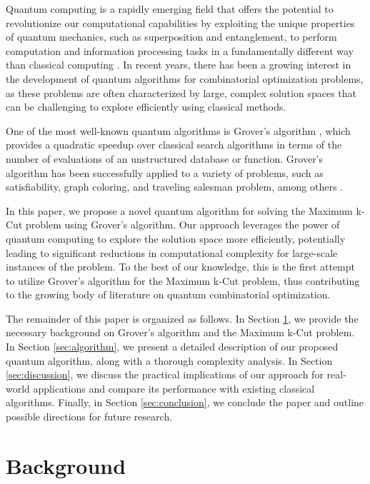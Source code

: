 Quantum computing is a rapidly emerging field that offers the potential to revolutionize our computational capabilities by exploiting the unique properties of quantum mechanics, such as superposition and entanglement, to perform computation and information processing tasks in a fundamentally different way than classical computing \cite{nielsen2002quantum}. In recent years, there has been a growing interest in the development of quantum algorithms for combinatorial optimization problems, as these problems are often characterized by large, complex solution spaces that can be challenging to explore efficiently using classical methods.

One of the most well-known quantum algorithms is Grover's algorithm \cite{grover1996fast}, which provides a quadratic speedup over classical search algorithms in terms of the number of evaluations of an unstructured database or function. Grover's algorithm has been successfully applied to a variety of problems, such as satisfiability, graph coloring, and traveling salesman problem, among others \cite{childs2017quantum, hadfield2019quantum}.

In this paper, we propose a novel quantum algorithm for solving the Maximum k-Cut problem using Grover's algorithm. Our approach leverages the power of quantum computing to explore the solution space more efficiently, potentially leading to significant reductions in computational complexity for large-scale instances of the problem. To the best of our knowledge, this is the first attempt to utilize Grover's algorithm for the Maximum k-Cut problem, thus contributing to the growing body of literature on quantum combinatorial optimization.

The remainder of this paper is organized as follows. In Section \ref{sec:background}, we provide the necessary background on Grover's algorithm and the Maximum k-Cut problem. In Section \ref{sec:algorithm}, we present a detailed description of our proposed quantum algorithm, along with a thorough complexity analysis. In Section \ref{sec:discussion}, we discuss the practical implications of our approach for real-world applications and compare its performance with existing classical algorithms. Finally, in Section \ref{sec:conclusion}, we conclude the paper and outline possible directions for future research.

\section{Background}
\label{sec:background}

